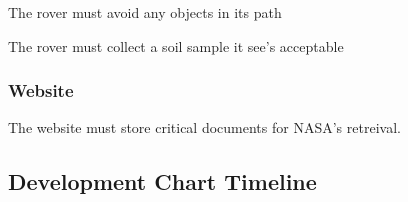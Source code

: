\documentclass[onecolumn, draftclsnofoot, 10pt, compsoc]{IEEEtran}
\begin{document}
The rover must avoid any objects in its path

The rover must collect a soil sample it see's acceptable 

\subsubsection{Website}
The website must store critical documents for NASA's retreival. 

\subsection{Development Chart Timeline}
\begin{center}
\end{center}
\end{document}
